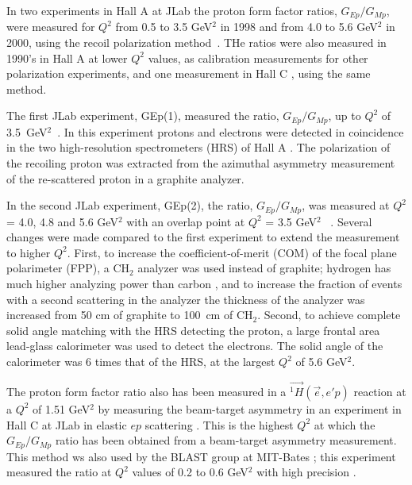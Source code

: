 In two experiments in Hall A at JLab the proton form factor ratios, $G_{Ep}/G_{Mp}$, were measured for $Q^{2}$ 
from 0.5 to 3.5 GeV$^{2}$ in 1998 and from 4.0 to 5.6 GeV$^2$ in 2000, using the recoil polarization 
method~\cite{jones,gayou:2002,punjabi05A}. 
THe ratios were also measured in 1990's in Hall A \cite{gayou:2001,strauch,hu} at lower $Q^2$ values, as 
calibration measurements for other polarization experiments, and one measurement in Hall C \cite{mac}, using the same method. 

The first JLab experiment, GEp(1), measured the ratio, $G_{Ep}/G_{Mp}$,  
up to $Q^{2}$ of 3.5~GeV$^{2}$~\cite{jones,punjabi05A}. In this experiment protons
and electrons were detected in coincidence in the two high-resolution
spectrometers (HRS) of Hall A \cite{nimhallA}. The polarization of the recoiling 
proton was extracted from the azimuthal asymmetry measurement of the 
re-scattered proton in a graphite analyzer.

In the second JLab experiment, GEp(2), the ratio, $G_{Ep}/G_{Mp}$, was measured at $Q^{2}$ = 4.0, 4.8 and 5.6 GeV$^{2}$ with an overlap 
point at $Q^{2}$ = 3.5 GeV$^{2}$ ~\cite{gayou:2002,puckett:2011}. 
Several changes were made compared to the first experiment to extend the measurement to
higher $Q^2$. First, to increase the coefficient-of-merit (COM) of the focal plane 
polarimeter (FPP), a CH$_{2}$ analyzer was used instead of graphite; hydrogen has 
much higher analyzing power \cite{spinka,dmiller} than carbon \cite{cheung}, and to 
increase the fraction of events with a second scattering in the analyzer the
thickness of the analyzer was increased from 50 cm of graphite to 100~cm of CH$_{2}$.
Second, to achieve complete solid angle matching with the 
HRS detecting the proton, a large frontal area lead-glass calorimeter was used to detect the electrons. 
The solid angle of the calorimeter was 6 times that of the HRS, at the largest $Q^{2}$ of 5.6 GeV$^2$. 

The proton form factor ratio also has been measured in a $\vec {^1H}(\vec e,e'p)$ reaction at a $Q^2$ of 1.51 GeV$^2$ 
by measuring the beam-target asymmetry in an experiment in Hall C at JLab in elastic $ep$ scattering \cite{Jones06}.
This is the highest $Q^2$ at which the $G_{Ep}/G_{Mp}$ ratio has been obtained from a beam-target asymmetry measurement. 
This method ws also used  by the BLAST group at MIT-Bates \cite{crawford}; this experiment measured the ratio at $Q^2$ values 
of 0.2 to 0.6 GeV$^2$ with high precision \cite{crawford}.  


